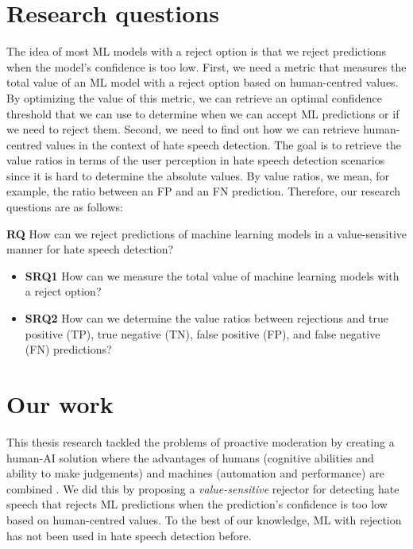\section{Research questions}
%
The idea of most ML models with a reject option is that we reject predictions when the model's confidence is too low.
%
First, we need a metric that measures the total value of an ML model with a reject option based on human-centred values.
%
By optimizing the value of this metric, we can retrieve an optimal confidence threshold that we can use to determine when we can accept ML predictions or if we need to reject them.
%
Second, we need to find out how we can retrieve human-centred values in the context of hate speech detection.
%
The goal is to retrieve the value ratios in terms of the user perception in hate speech detection scenarios since it is hard to determine the absolute values.
%
By value ratios, we mean, for example, the ratio between an FP and an FN prediction.
%
Therefore, our research questions are as follows:
%

\begin{flushleft}
	\textbf{RQ} How can we reject predictions of machine learning models in a value-sensitive manner for hate speech detection?
	\begin{itemize}
		\item \textbf{SRQ1} How can we measure the total value of machine learning models with a reject option?
		\item \textbf{SRQ2} How can we determine the value ratios between rejections and true positive (TP), true negative (TN), false positive (FP), and false negative (FN) predictions?
	\end{itemize}
\end{flushleft}

\section{Our work}
This thesis research tackled the problems of proactive moderation by creating a human-AI solution where the advantages of humans (cognitive abilities and ability to make judgements) and machines (automation and performance) are combined \citep{woo2020future}.
%
We did this by proposing a \emph{value-sensitive} rejector for detecting hate speech that rejects ML predictions when the prediction's confidence is too low based on human-centred values.
%
To the best of our knowledge, ML with rejection has not been used in hate speech detection before.
%

